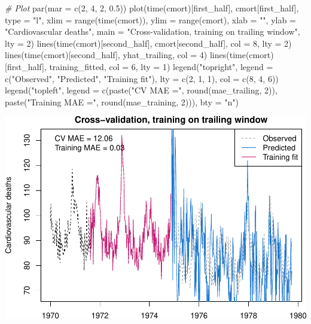 \documentclass[
]{article}
\newenvironment{Shaded}{\begin{snugshade}}{\end{snugshade}}
\newcommand{\AttributeTok}[1]{\textcolor[rgb]{0.77,0.63,0.00}{#1}}
\newcommand{\CommentTok}[1]{\textcolor[rgb]{0.56,0.35,0.01}{\textit{#1}}}
\newcommand{\DecValTok}[1]{\textcolor[rgb]{0.00,0.00,0.81}{#1}}
\newcommand{\FloatTok}[1]{\textcolor[rgb]{0.00,0.00,0.81}{#1}}
\newcommand{\FunctionTok}[1]{\textcolor[rgb]{0.00,0.00,0.00}{#1}}
\newcommand{\NormalTok}[1]{#1}
\newcommand{\StringTok}[1]{\textcolor[rgb]{0.31,0.60,0.02}{#1}}
\begin{document}
\begin{Shaded}
\begin{Highlighting}[]
\CommentTok{\# Plot}
\FunctionTok{par}\NormalTok{(}\AttributeTok{mar =} \FunctionTok{c}\NormalTok{(}\DecValTok{2}\NormalTok{, }\DecValTok{4}\NormalTok{, }\DecValTok{2}\NormalTok{, }\FloatTok{0.5}\NormalTok{))}
\FunctionTok{plot}\NormalTok{(}\FunctionTok{time}\NormalTok{(cmort)[first\_half], cmort[first\_half], }\AttributeTok{type =} \StringTok{"l"}\NormalTok{, }
     \AttributeTok{xlim =} \FunctionTok{range}\NormalTok{(}\FunctionTok{time}\NormalTok{(cmort)), }\AttributeTok{ylim =} \FunctionTok{range}\NormalTok{(cmort),}
     \AttributeTok{xlab =} \StringTok{""}\NormalTok{, }\AttributeTok{ylab =} \StringTok{"Cardiovascular deaths"}\NormalTok{, }
     \AttributeTok{main =} \StringTok{"Cross{-}validation, training on trailing window"}\NormalTok{, }\AttributeTok{lty =} \DecValTok{2}\NormalTok{)}
\FunctionTok{lines}\NormalTok{(}\FunctionTok{time}\NormalTok{(cmort)[second\_half], cmort[second\_half], }\AttributeTok{col =} \DecValTok{8}\NormalTok{, }\AttributeTok{lty =} \DecValTok{2}\NormalTok{)}
\FunctionTok{lines}\NormalTok{(}\FunctionTok{time}\NormalTok{(cmort)[second\_half], yhat\_trailing, }\AttributeTok{col =} \DecValTok{4}\NormalTok{)}
\FunctionTok{lines}\NormalTok{(}\FunctionTok{time}\NormalTok{(cmort)[first\_half], training\_fitted, }\AttributeTok{col =} \DecValTok{6}\NormalTok{, }\AttributeTok{lty =} \DecValTok{1}\NormalTok{)}
\FunctionTok{legend}\NormalTok{(}\StringTok{"topright"}\NormalTok{, }\AttributeTok{legend =} \FunctionTok{c}\NormalTok{(}\StringTok{"Observed"}\NormalTok{, }\StringTok{"Predicted"}\NormalTok{, }\StringTok{"Training fit"}\NormalTok{), }
       \AttributeTok{lty =} \FunctionTok{c}\NormalTok{(}\DecValTok{2}\NormalTok{, }\DecValTok{1}\NormalTok{, }\DecValTok{1}\NormalTok{), }\AttributeTok{col =} \FunctionTok{c}\NormalTok{(}\DecValTok{8}\NormalTok{, }\DecValTok{4}\NormalTok{, }\DecValTok{6}\NormalTok{))}
\FunctionTok{legend}\NormalTok{(}\StringTok{"topleft"}\NormalTok{, }\AttributeTok{legend =} \FunctionTok{c}\NormalTok{(}\FunctionTok{paste}\NormalTok{(}\StringTok{"CV MAE ="}\NormalTok{, }\FunctionTok{round}\NormalTok{(mae\_trailing, }\DecValTok{2}\NormalTok{)), }
                             \FunctionTok{paste}\NormalTok{(}\StringTok{"Training MAE ="}\NormalTok{, }\FunctionTok{round}\NormalTok{(mae\_training, }\DecValTok{2}\NormalTok{))),}
       \AttributeTok{bty =} \StringTok{"n"}\NormalTok{)}
\end{Highlighting}
\end{Shaded}

\includegraphics{homework2_files/figure-latex/unnamed-chunk-5-1.pdf}
\end{document}
